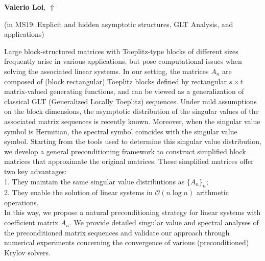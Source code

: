 \documentclass[ILAS2025-program.tex]{subfiles}
\begin{document}
\hypertarget{down0173}{}\begin{ilasabstract}
    
\textbf{Valerio Loi},  \hfill \hyperlink{up0173}{$\Uparrow$}
    
    
(in {\color{mstitle}MS19: Explicit and hidden asymptotic structures, GLT Analysis, and applications})
        
\mtskip
    Large block-structured matrices with Toeplitz-type blocks of different sizes frequently arise in various applications, but pose computational issues when solving the associated linear systems. In our setting, the matrices \(A_n\) are composed of (block rectangular) Toeplitz blocks defined by rectangular \(s \times t\) matrix-valued generating functions, and can be viewed as a generalization of classical GLT (Generalized Locally Toeplitz) sequences. Under mild assumptions on the block dimensions, the asymptotic distribution of the singular values of the associated matrix sequences is recently known. Moreover, when the singular value symbol is Hermitian, the spectral symbol coincides with the singular value symbol. Starting from the tools used to determine this singular value distribution, we develop a general preconditioning framework to construct simplified block matrices that approximate the original matrices. These simplified matrices offer two key advantages:\\
1. They maintain the same singular value distributions as \(\{A_n\}_{n}\); \\
2. They enable the solution of linear systems in \(\mathcal{O}(n \log n)\) arithmetic operations.\\
In this way, we propose a natural preconditioning strategy for linear systems with coefficient matrix \(A_n\). We provide detailed singular value and spectral analyses of the preconditioned matrix sequences and validate our approach through numerical experiments concerning the convergence of various (preconditioned) Krylov solvers.

\end{ilasabstract}
    
\end{document}
